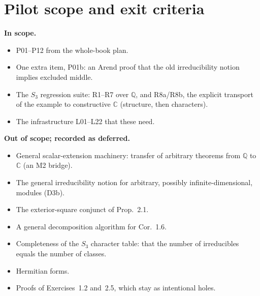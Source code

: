 \documentclass[11pt,a4paper]{article}
\newcommand{\Q}{\mathbb Q}
\newcommand{\C}{\mathbb C}
\begin{document}
\section{Pilot scope and exit criteria}\label{sec:scope}
\textbf{In scope.}
\begin{itemize}
  \item P01--P12 from the whole-book plan.
  \item One extra item, P01b: an Arend proof that the old irreducibility notion
  implies excluded middle.
  \item The $S_3$ regression suite: R1--R7 over $\Q$, and R8a/R8b, the
  explicit transport of the example to constructive $\C$ (structure, then
  characters).
  \item The infrastructure L01--L22 that these need.
\end{itemize}

\textbf{Out of scope; recorded as deferred.}
\begin{itemize}
  \item General scalar-extension machinery: transfer of arbitrary theorems from
  $\Q$ to $\C$ (an M2 bridge).
  \item The general irreducibility notion for arbitrary, possibly
  infinite-dimensional, modules (D3b).
  \item The exterior-square conjunct of Prop.~2.1.
  \item A general decomposition algorithm for Cor.~1.6.
  \item Completeness of the $S_3$ character table: that the number of
  irreducibles equals the number of classes.
  \item Hermitian forms.
  \item Proofs of Exercises~1.2 and~2.5, which stay as intentional holes.
\end{itemize}
\end{document}
